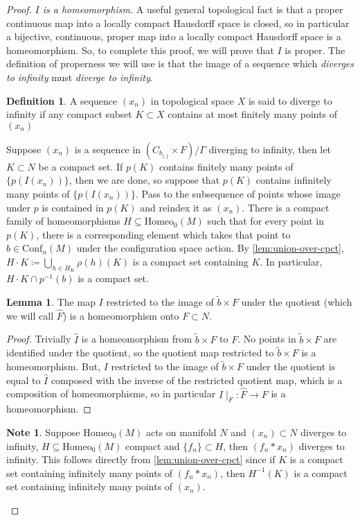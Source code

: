\documentclass[10pt, oneside]{article}
\newcommand{\homeo}[1][S^1]{\text{Homeo}_0(#1)}
\newcommand{\conf}[2][S^1]{\text{Conf}_{#2}(#1)}
\newcommand{\set}{{\{\cdot\}}}
\newcommand{\maxcov}{C_{b_\set}}
\theoremstyle{definition}
\newtheorem{defn}{Definition}[section]
\newtheorem*{lem*}{Lemma}
\newtheorem*{note*}{Note}
\theoremstyle{definition}
\begin{document}
\begin{proof}
    \medskip
    {\it $I$ is a homeomorphism.} A useful general topological fact is that a proper continuous map into a locally compact Hausdorff space is closed, so in particular a bijective, continuous, proper map into a locally compact Hausdorff space is a homeomorphism. So, to complete this proof, we will prove that $I$ is proper. The definition of properness we will use is that the image of a sequence which {\it diverges to infinity} must {\it diverge to infinity}.
    \begin{defn}
        A sequence $(x_n)$ in topological space $X$ is said to diverge to infinity if any compact subset $K\subset X$ contains at most finitely many points of $(x_n)$
    \end{defn}
    Suppose $(x_n)$ is a sequence in $(\maxcov\times F)/\Gamma$ diverging to infinity, then let $K\subset N$ be a compact set. If $p(K)$ contains finitely many points of $\{p(I(x_n))\}$, then we are done, so suppose that $p(K)$ contains infinitely many points of $\{p(I(x_n))\}$. Pass to the subsequence of points whose image under $p$ is contained in $p(K)$ and reindex it as $(x_n)$.  There is a compact family of homeomorphisms $H\subseteq \homeo[M]$ such that for every point in $p(K)$, there is a corresponding element which takes that point to $b\in\conf[M]{n}$ under the configuration space action. By \cref{lem:union-over-cpct}, $H\cdot K\coloneqq \bigcup_{h\in H_K}\rho(h)(K)$ is a compact set containing $K$. In particular, $H\cdot K\cap p^{-1}(b)$ is a compact set.

    \begin{lem*}
        The map $I$ restricted to the image of $\tilde{b}\times F$ under the quotient (which we will call $\hat{F}$) is a homeomorphism onto $F\subset N$.
    \end{lem*}
    \begin{proof}
        Trivially $\hat{I}$ is a homeomorphism from $\tilde{b}\times F$ to $F$.
        No points in $\tilde{b}\times F$ are identified under the quotient, so the quotient map restricted to $\tilde{b}\times F$ is a homeomorphism.
        But, $I$ restricted to the image of $\tilde{b}\times F$ under the quotient is equal to
        $\hat{I}$ composed with the inverse of the restricted quotient map, which is a composition of homeomorphisms, so in particular
        $I\mid_{\hat{F}}: \hat{F} \to F$ is a homeomorphism.
    \end{proof}

    \begin{note*}
        Suppose $\homeo[M]$ acts on manifold $N$ and $(x_n)\subset N$ diverges to infinity, $H\subseteq\homeo[M]$ compact and $\{f_n\}\subset H$, then $(f_n*x_n)$ diverges to infinity. This follows directly from \cref{lem:union-over-cpct} since if $K$ is a compact set containing infinitely many points of $(f_n*x_n)$, then $H^{-1}(K)$ is a compact set containing infinitely many points of $(x_n)$.
    \end{note*}


\end{proof}
\end{document}
